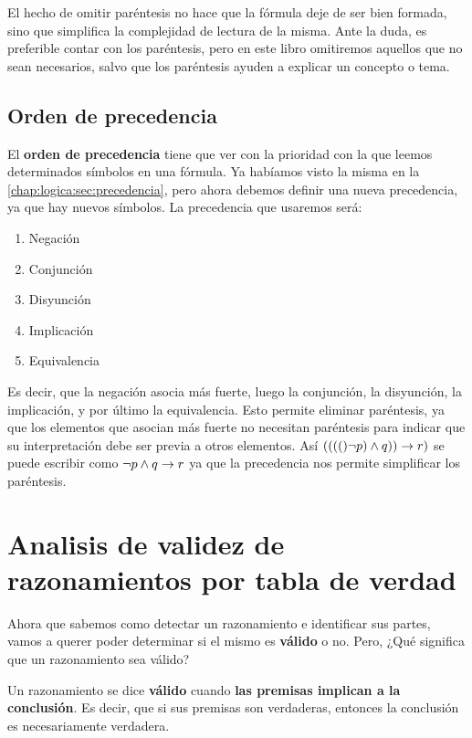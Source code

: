El hecho de omitir paréntesis no hace que la fórmula deje de ser bien formada,
sino que simplifica la complejidad de lectura de la misma. Ante la duda, es
preferible contar con los paréntesis, pero en este libro omitiremos aquellos que
no sean necesarios, salvo que los paréntesis ayuden a explicar un concepto o
tema.

\subsection{Orden de precedencia}
\label{chap:logica_proposicional:subsec:orden_precedencia }

El \textbf{orden de precedencia} tiene que ver con la prioridad con la que
leemos determinados símbolos en una fórmula. Ya habíamos visto la misma en la
\autoref{chap:logica:sec:precedencia}, pero ahora debemos definir una nueva
precedencia, ya que hay nuevos símbolos. La precedencia que usaremos será:

\begin{enumerate}
    \item Negación
    \item Conjunción
    \item Disyunción
    \item Implicación
    \item Equivalencia
\end{enumerate}

Es decir, que la negación asocia más fuerte, luego la conjunción, la disyunción,
la implicación, y por último la equivalencia. Esto permite eliminar paréntesis,
ya que los elementos que asocian más fuerte no necesitan paréntesis para indicar
que su interpretación debe ser previa a otros elementos. Así \textit{$(((()\lnot
p) \land q)) \to r)$} se puede escribir como \textit{$\lnot p \land q \to
r$} ya que la precedencia nos permite simplificar los paréntesis.

\section{Analisis de validez de razonamientos por tabla de verdad}
\label{chap:logica_proposicional:sec:validez }

Ahora que sabemos como detectar un razonamiento e identificar sus partes, vamos
a querer poder determinar si el mismo es \textbf{válido} o no. Pero, ¿Qué
significa que un razonamiento sea válido?

\begin{definition}
    Un razonamiento se dice \textbf{válido} cuando
    \textbf{las premisas implican a la conclusión}. Es decir, que si sus
    premisas son verdaderas, entonces la conclusión es necesariamente verdadera.
\end{definition}

